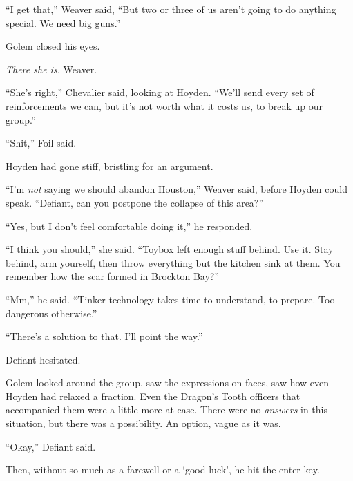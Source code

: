 ``I get that,'' Weaver said, ``But two or three of us aren't going to do anything special.  We need big guns.''



Golem closed his eyes.



\emph{There she is.  }Weaver.



``She's right,'' Chevalier said, looking at Hoyden.  ``We'll send every set of reinforcements we can, but it's not worth what it costs us, to break up our group.''



``Shit,'' Foil said.



Hoyden had gone stiff, bristling for an argument.



``I'm \emph{not} saying we should abandon Houston,'' Weaver said, before Hoyden could speak.  ``Defiant, can you postpone the collapse of this area?''



``Yes, but I don't feel comfortable doing it,'' he responded.



``I think you should,'' she said.  ``Toybox left enough stuff behind.  Use it.  Stay behind, arm yourself, then throw everything but the kitchen sink at them.  You remember how the scar formed in Brockton Bay?''



``Mm,'' he said.  ``Tinker technology takes time to understand, to prepare.  Too dangerous otherwise.''



``There's a solution to that.  I'll point the way.''



Defiant hesitated.



Golem looked around the group, saw the expressions on faces, saw how even Hoyden had relaxed a fraction.  Even the Dragon's Tooth officers that accompanied them were a little more at ease.  There were no \emph{answers} in this situation, but there was a possibility.  An option, vague as it was.



``Okay,'' Defiant said.



Then, without so much as a farewell or a `good luck', he hit the enter key.



